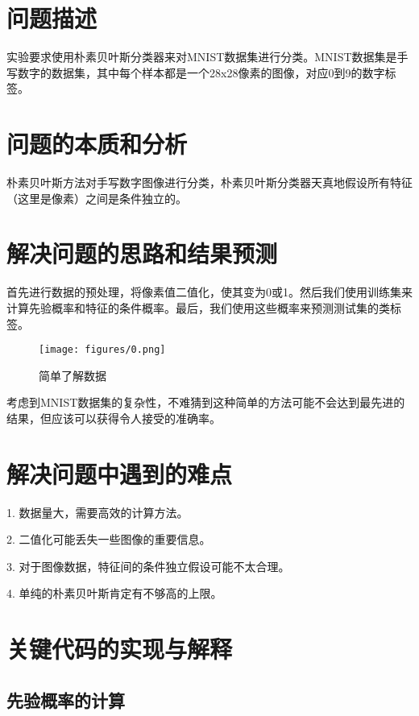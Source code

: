\documentclass[12pt]{article}
\begin{document}
\vspace{-10cm}

\section{问题描述}
实验要求使用朴素贝叶斯分类器来对MNIST数据集进行分类。MNIST数据集是手写数字的数据集，其中每个样本都是一个28x28像素的图像，对应0到9的数字标签。

\section{问题的本质和分析}
朴素贝叶斯方法对手写数字图像进行分类，朴素贝叶斯分类器天真地假设所有特征（这里是像素）之间是条件独立的。

\section{解决问题的思路和结果预测}
首先进行数据的预处理，将像素值二值化，使其变为0或1。然后我们使用训练集来计算先验概率和特征的条件概率。最后，我们使用这些概率来预测测试集的类标签。

\begin{figure}[H]
    \centering
    \hspace*{-1.4cm}
    \texttt{[image: figures/0.png]}
    \caption{简单了解数据}
    \label{fig:your_label}
\end{figure}

考虑到MNIST数据集的复杂性，不难猜到这种简单的方法可能不会达到最先进的结果，但应该可以获得令人接受的准确率。

\section{解决问题中遇到的难点}
1. 数据量大，需要高效的计算方法。

2. 二值化可能丢失一些图像的重要信息。

3. 对于图像数据，特征间的条件独立假设可能不太合理。

4. 单纯的朴素贝叶斯肯定有不够高的上限。

\section{关键代码的实现与解释}

\subsection{先验概率的计算}
\end{document}
